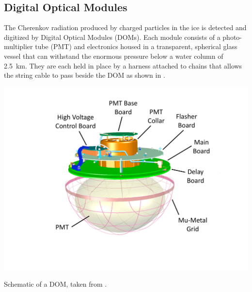 \subsection{Digital Optical Modules}
\label{sec:dom-daq}
The Cherenkov radiation produced by charged particles in the ice is detected and digitized by Digital Optical Modules (DOMs).
Each module consists of a photo-multiplier tube (PMT) and electronics housed in a transparent, spherical glass vessel that can withstand the enormous pressure below a water column of 2.5~km\cite{icecube_detector_17}.
They are each held in place by a harness attached to chains that allows the string cable to pass beside the DOM as shown in .
\begin{marginfigure}[*-20]
    \includegraphics[width=\textwidth]{figures/icecube/domfig1a-DOM3DModel.pdf}
    \caption{Schematic of a DOM, taken from \cite{icecube_detector_17}.}
    \label{fig:dom-schematic}
\end{marginfigure}
